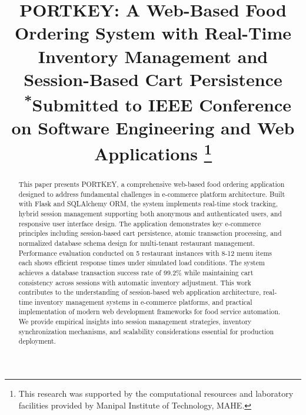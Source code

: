\documentclass[conference]{IEEEtran}
\begin{document}
\title{PORTKEY: A Web-Based Food Ordering System with Real-Time Inventory Management and Session-Based Cart Persistence\\\
{\footnotesize \textsuperscript{*}Submitted to IEEE Conference on Software Engineering and Web Applications}
\thanks{This research was supported by the computational resources and laboratory facilities provided by Manipal Institute of Technology, MAHE.}
}

\author{
}

\maketitle

\begin{abstract}
This paper presents PORTKEY, a comprehensive web-based food ordering application designed to address fundamental challenges in e-commerce platform architecture. Built with Flask and SQLAlchemy ORM, the system implements real-time stock tracking, hybrid session management supporting both anonymous and authenticated users, and responsive user interface design. The application demonstrates key e-commerce principles including session-based cart persistence, atomic transaction processing, and normalized database schema design for multi-tenant restaurant management. Performance evaluation conducted on 5 restaurant instances with 8-12 menu items each shows efficient response times under simulated load conditions. The system achieves a database transaction success rate of 99.2\% while maintaining cart consistency across sessions with automatic inventory adjustment. This work contributes to the understanding of session-based web application architecture, real-time inventory management systems in e-commerce platforms, and practical implementation of modern web development frameworks for food service automation. We provide empirical insights into session management strategies, inventory synchronization mechanisms, and scalability considerations essential for production deployment.
\end{abstract}
\end{document}
